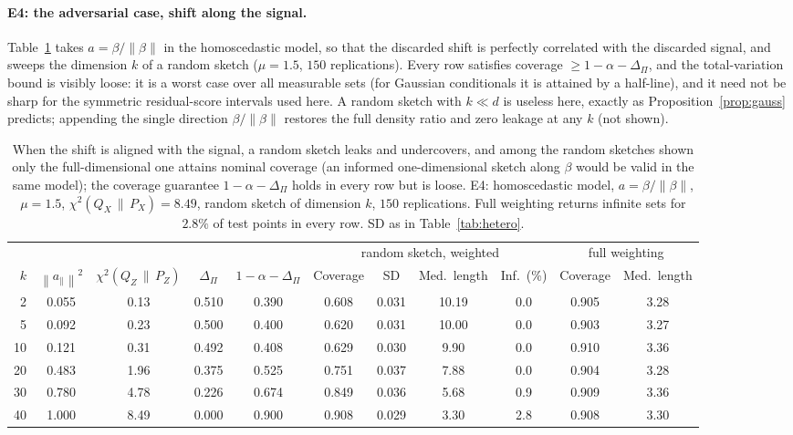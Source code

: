 \documentclass[11pt,a4paper]{article}
\newcommand{\PX}{P_X}
\newcommand{\QX}{Q_X}
\newcommand{\chisq}{\chi^2(\QX\,\|\,\PX)}
\newcommand{\chisqZ}{\chi^2(Q_Z\,\|\,P_Z)}
\newcommand{\norm}[1]{\left\|#1\right\|}
\theoremstyle{plain}
\theoremstyle{definition}
\theoremstyle{remark}
\begin{document}
\FloatBarrier
\paragraph{E4: the adversarial case, shift along the signal.}
Table~\ref{tab:signal} takes $a=\beta/\norm\beta$ in the homoscedastic model, so that the discarded shift is perfectly correlated with the discarded signal, and sweeps the dimension $k$ of a random sketch ($\mu=1.5$, $150$ replications). Every row satisfies coverage $\ge1-\alpha-\Delta_\Pi$, and the total-variation bound is visibly loose: it is a worst case over all measurable sets (for Gaussian conditionals it is attained by a half-line), and it need not be sharp for the symmetric residual-score intervals used here. A random sketch with $k\ll d$ is useless here, exactly as Proposition~\ref{prop:gauss} predicts; appending the single direction $\beta/\norm\beta$ restores the full density ratio and zero leakage at any $k$ (not shown).

\begin{table}[!htbp]\centering\footnotesize\setlength{\tabcolsep}{2.4pt}
\begin{tabular}{rcccc|cccc|cc}
\toprule
 & & & & & \multicolumn{4}{c|}{random sketch, weighted} & \multicolumn{2}{c}{full weighting}\\
$k$ & $\norm{a_\parallel}^2$ & $\chisqZ$ & $\Delta_\Pi$ & $1-\alpha-\Delta_\Pi$ & Coverage & SD & Med.\ length & Inf.\ (\%) & Coverage & Med.\ length\\
\midrule
 2 & 0.055 & 0.13 & 0.510 & 0.390 & 0.608 & 0.031 & 10.19 & 0.0 & 0.905 & 3.28\\
 5 & 0.092 & 0.23 & 0.500 & 0.400 & 0.620 & 0.031 & 10.00 & 0.0 & 0.903 & 3.27\\
10 & 0.121 & 0.31 & 0.492 & 0.408 & 0.629 & 0.030 & 9.90 & 0.0 & 0.910 & 3.36\\
20 & 0.483 & 1.96 & 0.375 & 0.525 & 0.751 & 0.037 & 7.88 & 0.0 & 0.904 & 3.28\\
30 & 0.780 & 4.78 & 0.226 & 0.674 & 0.849 & 0.036 & 5.68 & 0.9 & 0.909 & 3.36\\
40 & 1.000 & 8.49 & 0.000 & 0.900 & 0.908 & 0.029 & 3.30 & 2.8 & 0.908 & 3.30\\
\bottomrule
\end{tabular}
\caption{When the shift is aligned with the signal, a random sketch leaks and undercovers, and among the random sketches shown only the full-dimensional one attains nominal coverage (an informed one-dimensional sketch along $\beta$ would be valid in the same model); the coverage guarantee $1-\alpha-\Delta_\Pi$ holds in every row but is loose. E4: homoscedastic model, $a=\beta/\norm\beta$, $\mu=1.5$, $\chisq=8.49$, random sketch of dimension $k$, $150$ replications. Full weighting returns infinite sets for $2.8\%$ of test points in every row. SD as in Table~\ref{tab:hetero}.}\label{tab:signal}
\end{table}
\end{document}
